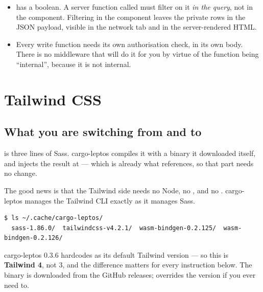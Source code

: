 \begin{itemize}
  \item {} has a  boolean. A server function called
     must filter on it \emph{in the query}, not in the component. Filtering in
    the component leaves the private rows in the JSON payload, visible in the network tab and in the
    server-rendered HTML.
  \item Every write function needs its own authorisation check, in its own body. There is no
    middleware that will do it for you by virtue of the function being ``internal'', because it is
    not internal.
\end{itemize}

\chapter{Tailwind CSS}
\label{ch:tailwind}

\section{What you are switching from and to}

 is three lines of Sass. cargo-leptos compiles it with a  binary it
downloaded itself, and injects the result at  --- which is already what
 references, so that part needs no change.

The good news is that the Tailwind side needs no Node, no , and no . cargo-leptos manages the Tailwind CLI exactly as it manages Sass.

\begin{verified}
\begin{lstlisting}[style=out]
$ ls ~/.cache/cargo-leptos/
  sass-1.86.0/  tailwindcss-v4.2.1/  wasm-bindgen-0.2.125/  wasm-bindgen-0.2.126/
\end{lstlisting}
cargo-leptos 0.3.6 hardcodes  as its default Tailwind version --- so this is
\textbf{Tailwind 4}, not 3, and the difference matters for every instruction below. The binary is
downloaded from the  GitHub releases; 
overrides the version if you ever need to.
\end{verified}

